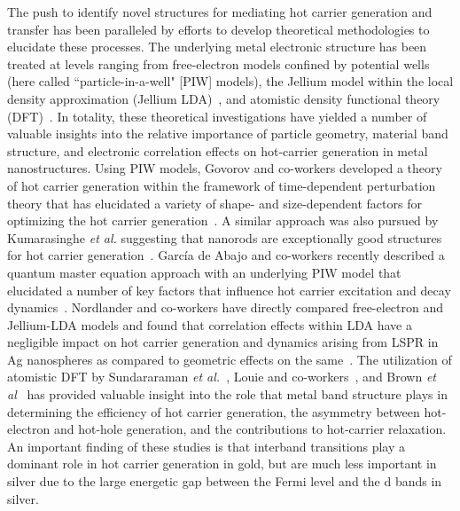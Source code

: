 \documentclass[journal=jpclcd,manuscript=article]{achemso}
\begin{document}
The push to identify novel structures for mediating hot carrier generation and transfer has been paralleled by 
efforts to develop theoretical methodologies to elucidate these processes.  The underlying metal electronic 
structure has been treated at levels ranging from free-electron models confined by 
potential wells~\cite{GZG_JPCC_2013,ZG_JPCC_2014,MLK_ACSNano_2014,KPB_SciRep_2015,SAG_ACSPhotonics_2016} 
(here called ``particle-in-a-well" [PIW] models), the Jellium model within the local density approximation (Jellium LDA)~\cite{MLK_ACSNano_2014},
and atomistic density functional theory (DFT)~\cite{SNJ_NatComm_2014,BMN_NatComm_2015,MWW_NatComm_2015,BSN_ACSNano_2016}.
In totality, these theoretical investigations have yielded a number of valuable insights into 
the relative importance of particle geometry, material band structure, and electronic correlation effects on hot-carrier
generation in metal nanostructures. 
Using PIW models, Govorov and co-workers developed a theory of 
hot carrier generation within the framework of time-dependent perturbation theory that
has elucidated a variety of shape- and size-dependent factors for optimizing 
the hot carrier generation~\cite{GZG_JPCC_2013,ZG_JPCC_2014}.  A similar approach was also pursued by Kumarasinghe {\it et al.} suggesting
that nanorods are exceptionally good structures for hot carrier generation~\cite{KPB_SciRep_2015}.  Garc\'ia de Abajo and co-workers recently described a 
quantum master equation approach with an underlying PIW model that elucidated a number of key factors that influence
hot carrier excitation and decay dynamics~\cite{SAG_ACSPhotonics_2016}. Nordlander and co-workers have directly 
compared free-electron and Jellium-LDA models and found that correlation effects within LDA have a negligible impact 
on hot carrier generation and dynamics arising from LSPR in Ag nanospheres as compared to geometric effects
on the same~\cite{MLK_ACSNano_2014}. 
The utilization of atomistic DFT by Sundararaman {\it et al.}~\cite{SNJ_NatComm_2014}, 
Louie and co-workers~\cite{BMN_NatComm_2015}, and Brown {\it et al}~\cite{BSN_ACSNano_2016} 
has provided valuable insight into the role that metal band structure plays
in determining the efficiency of hot carrier generation, the asymmetry between hot-electron
and hot-hole generation, and the contributions to hot-carrier relaxation.  An important finding 
of these studies is that interband transitions play a dominant role in hot carrier generation in gold, but
are much less important in silver due to the large energetic gap between the Fermi level and the d bands
in silver.\cite{SNJ_NatComm_2014,BMN_NatComm_2015,MWW_NatComm_2015,BSN_ACSNano_2016}
\end{document}
